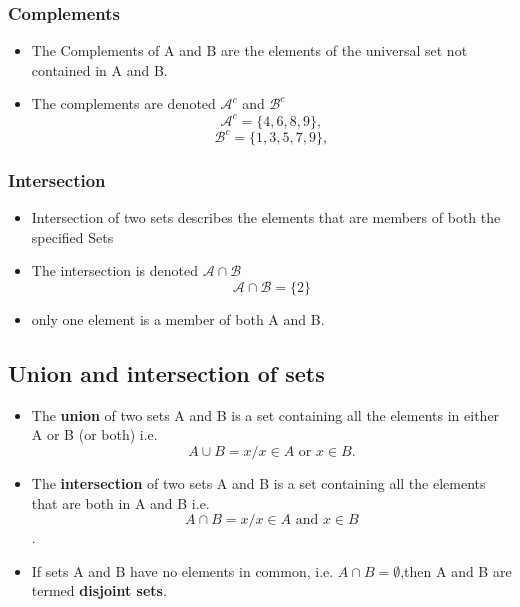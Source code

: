 \documentclass[12pt]{article}
\begin{document}
\subsubsection*{Complements}
\begin{itemize}

\item The Complements of A and B are the elements of the universal set not contained in A and B.

\item The complements are denoted $\mathcal{A}^{c}$ and $\mathcal{B}^{c}$
\[ \mathcal{A}^{c} = \{4,6,8,9\}, \]
\[ \mathcal{B}^{c} = \{1,3,5,7,9\}, \]

\end{itemize}



\subsubsection*{Intersection}
\begin{itemize}

\item Intersection of two sets describes the elements that are members of both the specified Sets

\item The intersection is denoted $\mathcal{A\cap B}$
\[ \mathcal{A\cap B} = \{2\}\]

\item only one element is a member of both A and B.
\end{itemize}


\subsection*{Union and intersection of sets}

\begin{itemize}
\item The \textbf{union} of two sets A and B is a set containing all the elements in
either A or B (or both)
i.e.
\[A \cup B = {x / x \in A \mbox{ or } x \in B}.\]
\item The \textbf{intersection} of two sets A and B is a set containing all the elements
that are both in A and B
i.e.
\[A \cap B = {x / x \in A \mbox{ and }x \in B}\].

\item If sets A and B have no elements in common, i.e. $A \cap B = \emptyset$,then A and B
are termed \textbf{disjoint sets}.
\end{itemize}
\end{document}
